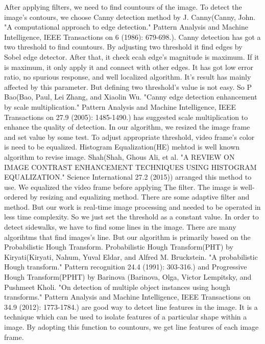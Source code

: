 \documentclass[a4class]{article}
\begin{document}
After applying filters, we need to find countours of the image. To detect the image's contours, we choose Canny detection method by J. Canny(Canny, John. "A computational approach to edge detection." Pattern Analysis and Machine Intelligence, IEEE Transactions on 6 (1986): 679-698.). Canny detection has got a two threshold to find countours. By adjusting two threshold it find edges by Sobel edge detector. After that, it check ecah edge's magnitude is maximum. If it is maximum, it only apply it and connect with other edges. It has got low error ratio, no spurious response, and well localized algorithm. It's result has mainly affected by this parameter. But defining two threshold's value is not easy. So P Bao(Bao, Paul, Lei Zhang, and Xiaolin Wu. "Canny edge detection enhancement by scale multiplication." Pattern Analysis and Machine Intelligence, IEEE Transactions on 27.9 (2005): 1485-1490.) has suggested scale multiplication to enhance the quality of detection. In our algorithm, we resized the image frame and set value by some test.\newline
To adjust appropriate threshold, video frame's color is need to be equalized. Histogram Equalization(HE) mehtod is well known algorithm to revise image. Shah(Shah, Ghous Ali, et al. "A REVIEW ON IMAGE CONTRAST ENHANCEMENT TECHNIQUES USING HISTOGRAM EQUALIZATION." Science International 27.2 (2015)) arranged this method to use. We equalized the video frame before applying The filter. The image is well-ordered by resizing and equalizing method. There are some adaptive filter and method. But our work is real-time image processing and needed to be operated in less time complexity. So we just set the threshold as a constant value. \newline
In order to detect sidewalks, we have to find some lines in the image. There are many algorihtms that find images's line. But our algorithm is primarily based on the Probabilistic Hough Transform. Probabilistic Hough Transform(PHT) by Kiryati(Kiryati, Nahum, Yuval Eldar, and Alfred M. Bruckstein. "A probabilistic Hough transform." Pattern recognition 24.4 (1991): 303-316.) and Progressive Hough Transform(PPHT) by Barinova (Barinova, Olga, Victor Lempitsky, and Pushmeet Kholi. "On detection of multiple object instances using hough transforms." Pattern Analysis and Machine Intelligence, IEEE Transactions on 34.9 (2012): 1773-1784.) are good way to detcet line features in the image. It is a technique which can be used to isolate features of a particular shape within a image. By adopting this function to countours, we get line features of each image frame. 
\end{document}
